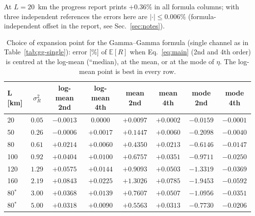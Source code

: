 \documentclass[11pt,a4paper]{article}
\theoremstyle{plain}
\theoremstyle{remark}
\begin{document}
\begin{table}[htbp]
\begin{tabular}{lccccccccc}
\bottomrule
\end{tabular}
\par\smallskip
\begin{minipage}{0.95\linewidth}\footnotesize At $L=20$~km the progress report prints $+0.36\%$ in all formula columns; with three independent references the errors here are $|\cdot|\le0.006\%$ (formula-independent offset in the report, see Sec.~\ref{sec:notes}).\end{minipage}
\end{table}

\begin{table}[htbp]
\centering\small
\caption{Choice of expansion point for the Gamma--Gamma formula (single channel as in Table~\ref{tab:gg-single}): error [\%] of $\mathbb E[R]$ when Eq.~\eqref{eq:main} (2nd and 4th order) is centred at the log-mean (``median), at the mean, or at the mode of $\eta$. The log-mean point is best in every row.}
\label{tab:expoint}
\begin{tabular}{lccccccc}
\toprule
L [km] & $\sigma_R^2$ & log-mean 2nd & log-mean 4th & mean 2nd & mean 4th & mode 2nd & mode 4th\\
\midrule
20 & $0.05$ & $-0.0013$ & $0.0000$ & $+0.0097$ & $+0.0002$ & $-0.0159$ & $-0.0001$ \\
50 & $0.26$ & $-0.0006$ & $+0.0017$ & $+0.1447$ & $+0.0060$ & $-0.2098$ & $-0.0040$ \\
80 & $0.61$ & $+0.0214$ & $+0.0060$ & $+0.4350$ & $+0.0213$ & $-0.6146$ & $-0.0147$ \\
100 & $0.92$ & $+0.0404$ & $+0.0100$ & $+0.6757$ & $+0.0351$ & $-0.9711$ & $-0.0250$ \\
120 & $1.29$ & $+0.0575$ & $+0.0144$ & $+0.9093$ & $+0.0503$ & $-1.3319$ & $-0.0369$ \\
160 & $2.19$ & $+0.0843$ & $+0.0225$ & $+1.3026$ & $+0.0785$ & $-1.9453$ & $-0.0592$ \\
80$^{*}$ & $3.00$ & $+0.0368$ & $+0.0139$ & $+0.7607$ & $+0.0507$ & $-1.0956$ & $-0.0351$ \\
80$^{*}$ & $5.00$ & $+0.0318$ & $+0.0090$ & $+0.5563$ & $+0.0313$ & $-0.7730$ & $-0.0206$ \\

\bottomrule
\end{tabular}
\end{table}
\end{document}
